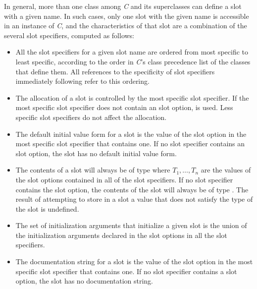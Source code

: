 In general, more than one class among \emph{C} and its superclasses can
define a slot with a given name.  In such cases, only one slot with
the given name is accessible in an instance of \emph{C}, and
the characteristics of that slot are a combination of the several slot
specifiers, computed as follows:

\begin{itemize}

\item  All the slot specifiers for a given slot name are ordered
from most specific to least specific, according to the order in \emph{C\/}'s
class precedence list of the classes that define them. All references
to the specificity of slot specifiers immediately following refer to this
ordering.

\item  The allocation of a slot is controlled by the most specific
slot specifier.  If the most specific slot specifier does not contain an
 slot option,  is used.  Less specific
slot specifiers do not affect the allocation.

\item  The default initial value form for a
slot is the value of the  slot option in the most
specific slot specifier that contains one.  If no slot specifier
contains an  slot option, the slot has no default
initial value form.

\item  The contents of a slot will always be of type 
where $T_1, \ldots, T_{n}$ are
the values of the  slot options contained in all of the slot
specifiers.  If no slot specifier contains the  slot option, the
contents of the slot will always be of type . The result
of attempting to store in a slot
a value that does not satisfy the type of the slot is undefined.

\item  The set of initialization arguments that initialize a given
slot is the union of the initialization arguments declared in the 
 slot options in all the slot specifiers.

\item  The documentation string for a slot is the value of the
 slot option in the most specific slot specifier
that contains one.  If no slot specifier contains a 
 slot option, the slot has no documentation string.
\end{itemize}

